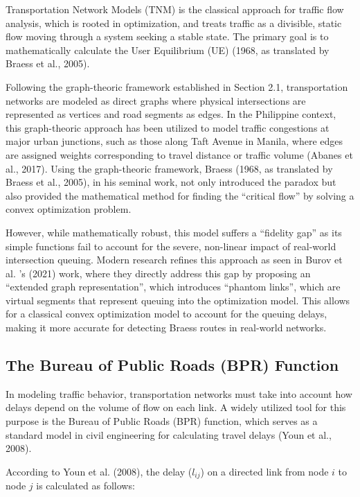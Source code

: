 Transportation Network Models (TNM) is the classical approach for traffic flow analysis, which is rooted in optimization, and treats traffic as a divisible, static flow moving through a system seeking a stable state. The primary goal is to mathematically calculate the User Equilibrium (UE) (1968, as translated by Braess et al., 2005).

Following the graph-theoric framework established in Section 2.1, transportation networks are modeled as direct graphs where physical intersections are represented as vertices and road segments as edges. In the Philippine context, this graph-theoric approach has been utilized to model traffic congestions at major urban junctions, such as those along Taft Avenue in Manila, where edges are assigned weights corresponding to travel distance or traffic volume (Abanes et al., 2017). Using the graph-theoric framework, Braess (1968, as translated by Braess et al., 2005), in his seminal work, not only introduced the paradox but also provided the mathematical method for finding the “critical flow” by solving a convex optimization problem.

However, while mathematically robust, this model suffers a “fidelity gap” as its simple functions fail to account for the severe, non-linear impact of real-world intersection queuing. Modern research refines this approach as seen in Burov et al. 's (2021) work, where they directly address this gap by proposing an “extended graph representation”, which introduces “phantom links”, which are virtual segments that represent queuing into the optimization model. This allows for a classical convex optimization model to account for the queuing delays, making it more accurate for detecting Braess routes in real-world networks.

\subsection{The Bureau of Public Roads (BPR) Function}
\label{chap:BPR}

In modeling traffic behavior, transportation networks must take into account how delays depend on the volume of flow on each link. A widely utilized tool for this purpose is the Bureau of Public Roads (BPR) function, which serves as a standard model in civil engineering for calculating travel delays (Youn et al., 2008).

According to Youn et al. (2008), the delay ($l_{ij}$) on a directed link from node $i$ to node $j$ is calculated as follows:

